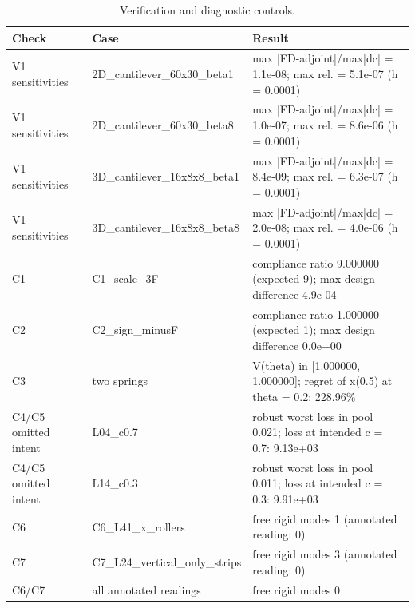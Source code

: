 \begin{table}[t]
\centering\small
\caption{Verification and diagnostic controls.}
\label{tab:tab_verification}
\begin{tabular}{llp{9cm}}
\toprule
Check & Case & Result \\
\midrule
V1 sensitivities & 2D\_cantilever\_60x30\_beta1 & max |FD-adjoint|/max|dc| = 1.1e-08; max rel. = 5.1e-07 (h = 0.0001) \\
V1 sensitivities & 2D\_cantilever\_60x30\_beta8 & max |FD-adjoint|/max|dc| = 1.0e-07; max rel. = 8.6e-06 (h = 0.0001) \\
V1 sensitivities & 3D\_cantilever\_16x8x8\_beta1 & max |FD-adjoint|/max|dc| = 8.4e-09; max rel. = 6.3e-07 (h = 0.0001) \\
V1 sensitivities & 3D\_cantilever\_16x8x8\_beta8 & max |FD-adjoint|/max|dc| = 2.0e-08; max rel. = 4.0e-06 (h = 0.0001) \\
C1 & C1\_scale\_3F & compliance ratio 9.000000 (expected 9); max design difference 4.9e-04 \\
C2 & C2\_sign\_minusF & compliance ratio 1.000000 (expected 1); max design difference 0.0e+00 \\
C3 & two springs & V(theta) in [1.000000, 1.000000]; regret of x(0.5) at theta = 0.2: 228.96\% \\
C4/C5 omitted intent & L04\_c0.7 & robust worst loss in pool 0.021; loss at intended c = 0.7: 9.13e+03 \\
C4/C5 omitted intent & L14\_c0.3 & robust worst loss in pool 0.011; loss at intended c = 0.3: 9.91e+03 \\
C6 & C6\_L41\_x\_rollers & free rigid modes 1 (annotated reading: 0) \\
C7 & C7\_L24\_vertical\_only\_strips & free rigid modes 3 (annotated reading: 0) \\
C6/C7 & all annotated readings & free rigid modes 0 \\
\bottomrule
\end{tabular}
\end{table}
